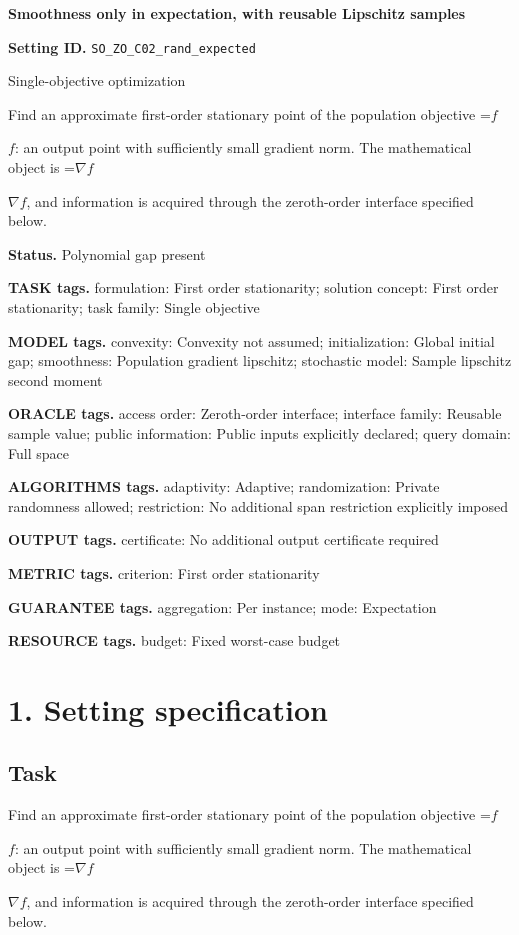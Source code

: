 \documentclass[10pt,a4paper]{article}
\newcommand{\AtlasMath}[1]{\par\begingroup\centering\setbox0=\hbox{$\displaystyle #1$}\ifdim\wd0>1.4\linewidth\typeout{ATLAS WIDE FORMULA: \the\wd0}\fi\ifdim\wd0>\linewidth\resizebox{\linewidth}{!}{\box0}\else\box0\fi\par\endgroup}
\newcommand{\AtlasInlineMath}[1]{\begingroup\setbox0=\hbox{$#1$}\ifdim\wd0>.4\linewidth\endgroup\AtlasMath{#1}\else\endgroup$#1$\fi}
\begin{document}
\raggedright

{\LARGE\bfseries\sffamily\color{AtlasNavy} Smoothness only in expectation, with reusable Lipschitz samples\par}\vspace{5pt}
\textbf{Setting ID.} \texttt{SO\_\allowbreak{}ZO\_\allowbreak{}C02\_\allowbreak{}rand\_\allowbreak{}expected}

Single-objective optimization

Find an approximate first-order stationary point of the population objective \AtlasInlineMath{f}: an output point with sufficiently small gradient norm. The mathematical object is \AtlasInlineMath{\nabla f}, and information is acquired through the zeroth-order interface specified below.

\textbf{Status.} Polynomial gap present

\textbf{TASK tags.} formulation: First order stationarity; solution concept: First order stationarity; task family: Single objective

\textbf{MODEL tags.} convexity: Convexity not assumed; initialization: Global initial gap; smoothness: Population gradient lipschitz; stochastic model: Sample lipschitz second moment

\textbf{ORACLE tags.} access order: Zeroth-order interface; interface family: Reusable sample value; public information: Public inputs explicitly declared; query domain: Full space

\textbf{ALGORITHMS tags.} adaptivity: Adaptive; randomization: Private randomness allowed; restriction: No additional span restriction explicitly imposed

\textbf{OUTPUT tags.} certificate: No additional output certificate required

\textbf{METRIC tags.} criterion: First order stationarity

\textbf{GUARANTEE tags.} aggregation: Per instance; mode: Expectation

\textbf{RESOURCE tags.} budget: Fixed worst-case budget

\section{1. Setting specification}
\subsection{Task}
Find an approximate first-order stationary point of the population objective \AtlasInlineMath{f}: an output point with sufficiently small gradient norm. The mathematical object is \AtlasInlineMath{\nabla f}, and information is acquired through the zeroth-order interface specified below.
\end{document}

